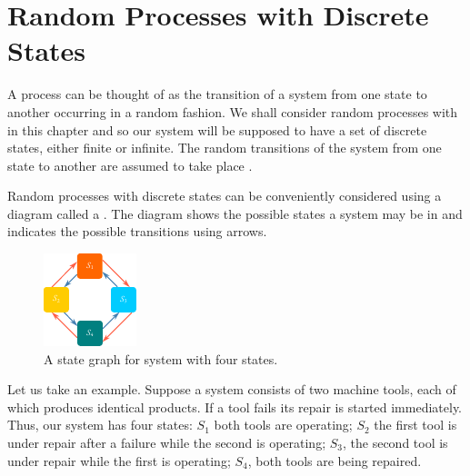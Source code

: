 \section{Random Processes with Discrete States}
A  process can be thought of as the transition of a system from
one state to another occurring in a random fashion. We shall consider
random processes with  in this chapter and so our system
will be supposed to have a set of discrete states, either finite or infinite.
The random transitions of the system from one state to another are
assumed to take place .

 Random processes with discrete states can be
conveniently considered using a diagram called a . The
diagram shows the possible states a system may be in and indicates the
possible transitions using arrows.
 \begin{figure}
 \centering
 \includegraphics[width=0.9\linewidth]{figures/state-graph1.pdf}
\caption{A state graph for system with four states.}
\label{state-graph1}
 \end{figure}
 
Let us take an example. Suppose a system consists of two machine
tools, each of which produces identical products. If a tool fails its repair
is started immediately. Thus, our system has four states: $S_{1}$ both tools
are operating; $S_{2}$ the first tool is under repair after a failure while the
second is operating; $S_{3}$, the second tool is under repair while the first is
operating; $S_{4}$, both tools are being repaired.

